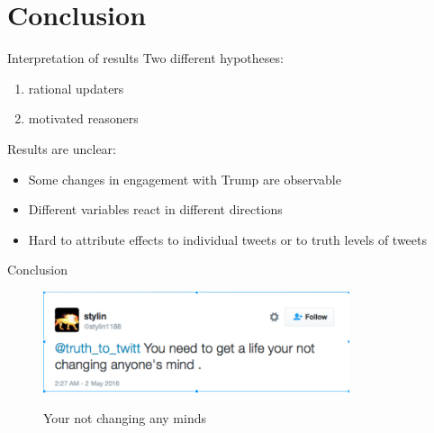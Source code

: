 \documentclass[10pt]{beamer}\usepackage[]{graphicx}\usepackage[]{color}
\begin{document}
\section{Conclusion}

\begin{frame}{Interpretation of results}
Two different hypotheses:
\begin{enumerate}
  \item rational updaters
  \item motivated reasoners
\end{enumerate}

Results are unclear:
\begin{itemize}
  \item Some changes in engagement with Trump are observable
  \item Different variables react in different directions
  \item Hard to attribute effects to individual tweets or to truth levels of tweets
\end{itemize}

\end{frame}

\begin{frame}{Conclusion}

\begin{figure}
\includegraphics[width=9cm]{../minds.png}
\label{fig:minds}
\caption{Your not changing any minds}
\end{figure}

\end{frame}
		
\end{document}

